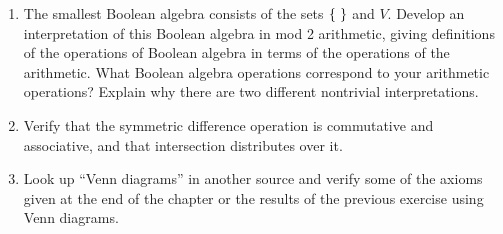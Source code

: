 \Exercises

\begin{enumerate}
\item  The smallest Boolean algebra consists
  of the sets $\mbox{$\{\;\}$}$ and $V$.  Develop an interpretation of this Boolean
  algebra in mod 2 arithmetic, giving definitions of the operations of Boolean
  algebra in terms of the operations of the arithmetic.  What Boolean algebra
  operations correspond to your arithmetic operations?  Explain why there are
  two different nontrivial interpretations. 

\item  Verify that the symmetric difference
  operation is commutative and associative, and that
  intersection distributes over it. 

\item  Look up ``Venn diagrams'' in another source and
  verify some of the axioms given at the end of the chapter or the results of
  the previous exercise using Venn diagrams. 
\end{enumerate}

